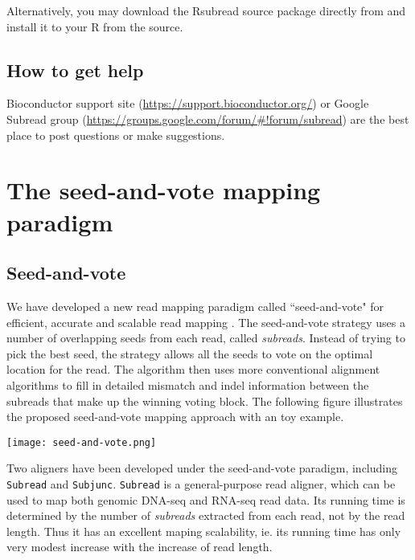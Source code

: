 \documentclass[12pt]{report}
\newcommand{\code}[1]{{\small\texttt{#1}}}
\newcommand{\Rsubread}{\textsf{Rsubread}}
\newcommand{\R}{\textsf{R}}
\begin{document}
Alternatively, you may download the {\Rsubread} source package directly from { } and install it to your {\R} from the source.


\section{How to get help}

Bioconductor support site (\url{https://support.bioconductor.org/}) or Google Subread group (\url{https://groups.google.com/forum/#!forum/subread}) are the best place to post questions or make suggestions.


\chapter{The seed-and-vote mapping paradigm}

\section{Seed-and-vote}

We have developed a new read mapping paradigm called ``seed-and-vote" for efficient, accurate and scalable read mapping \cite{liao}.
The seed-and-vote strategy uses a number of overlapping seeds from each read, called \emph{subreads}.
Instead of trying to pick the best seed, the strategy allows all the seeds to vote on the optimal location for the read.
The algorithm then uses more conventional alignment algorithms to fill in detailed mismatch and indel information between the subreads that make up the winning voting block. 
The following figure illustrates the proposed seed-and-vote mapping approach with an toy example.

\begin{center}
\texttt{[image: seed-and-vote.png]}
\end{center}

Two aligners have been developed under the seed-and-vote paradigm, including \code{Subread} and \code{Subjunc}.
\code{Subread} is a general-purpose read aligner, which can be used to map both genomic DNA-seq and RNA-seq read data.
Its running time is determined by the number of \emph{subreads} extracted from each read, not by the read length.
Thus it has an excellent maping scalability, ie. its running time has only very modest increase with the increase of read length.
\end{document}
